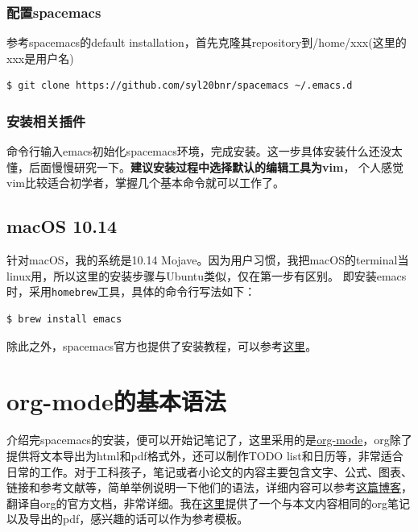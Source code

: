 \documentclass[11pt]{article}
\begin{document}
\subsubsection{配置spacemacs}
\label{sec:org7d7133a}
参考spacemacs的default installation，首先克隆其repository到/home/xxx(这里的xxx是用户名)
\begin{center}
\begin{verbatim}
$ git clone https://github.com/syl20bnr/spacemacs ~/.emacs.d
\end{verbatim}
\end{center}

\subsubsection{安装相关插件}
\label{sec:org650d2f2}
命令行输入emacs初始化spacemacs环境，完成安装。这一步具体安装什么还没太懂，后面慢慢研究一下。\textbf{建议安装过程中选择默认的编辑工具为vim}，
个人感觉vim比较适合初学者，掌握几个基本命令就可以工作了。

\subsection{macOS 10.14}
\label{sec:orgac497e6}
针对macOS，我的系统是10.14 Mojave。因为用户习惯，我把macOS的terminal当linux用，所以这里的安装步骤与Ubuntu类似，仅在第一步有区别。
即安装emacs时，采用\texttt{homebrew}工具，具体的命令行写法如下：
\begin{center}
\begin{verbatim}
$ brew install emacs
\end{verbatim}
\end{center}
除此之外，spacemacs官方也提供了安装教程，可以参考\href{https://github.com/syl20bnr/spacemacs\#macos}{这里}。

\section{org-mode的基本语法}
\label{sec:org86742b9}
介绍完spacemacs的安装，便可以开始记笔记了，这里采用的是\href{https://orgmode.org/}{org-mode}，org除了提供将文本导出为html和pdf格式外，还可以制作TODO list和日历等，非常适合日常的工作。对于工科孩子，笔记或者小论文的内容主要包含文字、公式、图表、链接和参考文献等，简单举例说明一下他们的语法，详细内容可以参考\href{https://www.cnblogs.com/Open\_Source/archive/2011/07/17/2108747.html}{这篇博客}，翻译自org的官方文档，非常详细。我在\href{https://github.com/myinxd/canal-notebooks/blob/master/org-template/org-template.org}{这里}提供了一个与本文内容相同的org笔记以及导出的pdf，感兴趣的话可以作为参考模板。
\end{document}
